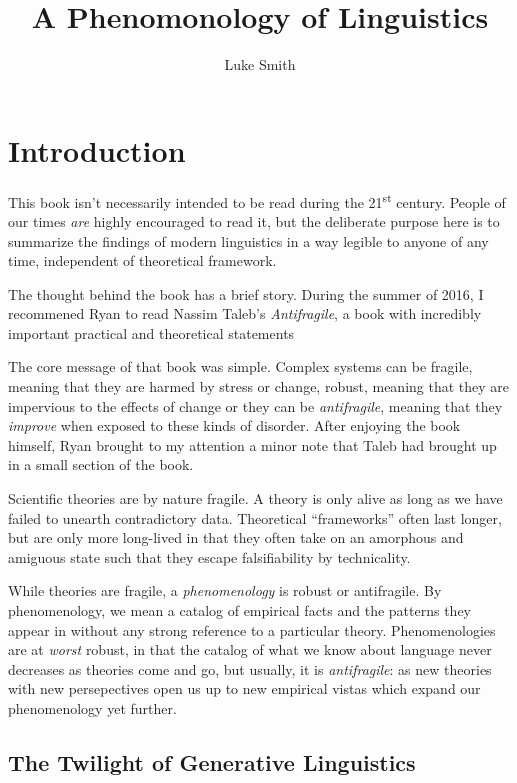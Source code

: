 \documentclass{book}
\title{A Phenomonology of Linguistics}
\author{Luke Smith}
\begin{document}
\maketitle

\chapter{Introduction}

This book isn't necessarily intended to be read during the 21\textsuperscript{st} century. People of our times \emph{are} highly encouraged to read it, but the deliberate purpose here is to summarize the findings of modern linguistics in a way legible to anyone of any time, independent of theoretical framework.

The thought behind the book has a brief story. During the summer of 2016, I recommened Ryan to read Nassim Taleb's \textit{Antifragile}, a book with incredibly important practical and theoretical statements

The core message of that book was simple. Complex systems can be fragile, meaning that they are harmed by stress or change, robust, meaning that they are impervious to the effects of change or they can be \emph{antifragile}, meaning that they \emph{improve} when exposed to these kinds of disorder. After enjoying the book himself, Ryan brought to my attention a minor note that Taleb had brought up in a small section of the book.

Scientific theories are by nature fragile. A theory is only alive as long as we have failed to unearth contradictory data. Theoretical ``frameworks'' often last longer, but are only more long-lived in that they often take on an amorphous and amiguous state such that they escape falsifiability by technicality.

While theories are fragile, a \emph{phenomenology} is robust or antifragile. By phenomenology, we mean a catalog of empirical facts and the patterns they appear in without any strong reference to a particular theory. Phenomenologies are at \emph{worst} robust, in that the catalog of what we know about language never decreases as theories come and go, but usually, it is \emph{antifragile}: as new theories with new persepectives open us up to new empirical vistas which expand our phenomenology yet further.


\section{The Twilight of Generative Linguistics}
\end{document}
